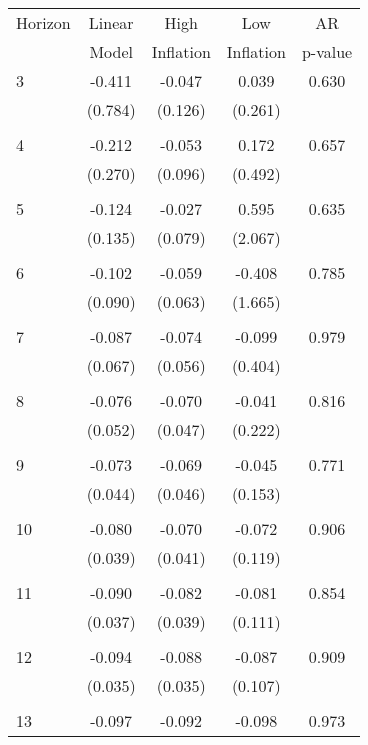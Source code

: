 \begin{tabular}{l*{1}{cccc}}
\hline\hline
 Horizon  & Linear & High                 & Low           & AR            \\
                  & Model         & Inflation & Inflation & p-value       \\
\hline
   3       & -0.411 & -0.047 & 0.039 & 0.630 \\
          & (0.784) & (0.126) & (0.261) & \\
 & & & &\\
   4       & -0.212 & -0.053 & 0.172 & 0.657 \\
          & (0.270) & (0.096) & (0.492) & \\
 & & & &\\
   5       & -0.124 & -0.027 & 0.595 & 0.635 \\
          & (0.135) & (0.079) & (2.067) & \\
 & & & &\\
   6       & -0.102 & -0.059 & -0.408 & 0.785 \\
          & (0.090) & (0.063) & (1.665) & \\
 & & & &\\
   7       & -0.087 & -0.074 & -0.099 & 0.979 \\
          & (0.067) & (0.056) & (0.404) & \\
 & & & &\\
   8       & -0.076 & -0.070 & -0.041 & 0.816 \\
          & (0.052) & (0.047) & (0.222) & \\
 & & & &\\
   9       & -0.073 & -0.069 & -0.045 & 0.771 \\
          & (0.044) & (0.046) & (0.153) & \\
 & & & &\\
  10       & -0.080 & -0.070 & -0.072 & 0.906 \\
          & (0.039) & (0.041) & (0.119) & \\
 & & & &\\
  11       & -0.090 & -0.082 & -0.081 & 0.854 \\
          & (0.037) & (0.039) & (0.111) & \\
 & & & &\\
  12       & -0.094 & -0.088 & -0.087 & 0.909 \\
          & (0.035) & (0.035) & (0.107) & \\
 & & & &\\
  13       & -0.097 & -0.092 & -0.098 & 0.973 \\

\end{tabular}
